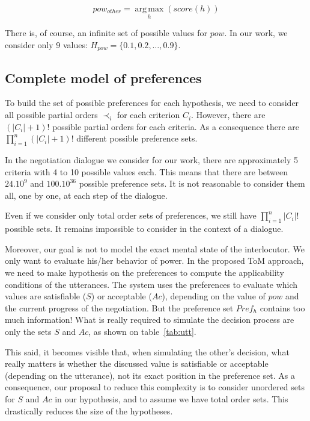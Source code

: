 \documentclass[sigconf]{aamas}  %
\begin{document}
	\begin{equation}
	pow_{other} = \operatorname*{arg\,max}_{h} (score(h))
	\end{equation}
	
	There is, of course, an infinite set of possible values for $pow$. In our work, we consider only 9 values: $H_{pow} = \{0.1, 0.2, \ldots, 0.9\}$.
	
	\subsection{Complete model of preferences}
	
	To build the set of possible preferences for each hypothesis, we need to consider all possible partial orders $\prec_i$ for each criterion $C_i$. However, there are $(|C_i| + 1)!$ possible partial orders for each criteria. As a consequence there are $\prod_{i=1}^n (|C_i|+1)!$ different possible preference sets.
	
	In the negotiation dialogue we consider for our work, there are approximately 5 criteria with 4 to 10 possible values each. This means that there are between $24.10^9$ and $100.10^{36}$ possible preference sets. It is not reasonable to consider them all, one by one, at each step of the dialogue.
	
	Even if we consider only total order sets of preferences, we still have  $\prod_{i=1}^n |C_i|!$ possible sets. It remains impossible to consider in the context of a dialogue.
	
	Moreover, our goal is not to model the exact mental state of the interlocutor. We only want to evaluate his/her behavior of power. In the proposed ToM approach, we need to make hypothesis on the preferences to compute the applicability conditions of the utterances. The system uses the preferences to evaluate which values are satisfiable ($S$) or acceptable ($Ac$), depending on the value of $pow$ and the current progress of the negotiation. But the preference set $Pref_h$ contains too much information! What is really required to simulate the decision process are only the sets $S$ and $Ac$, as shown on table~\ref{tab:utt}.
	
	This said, it becomes visible that, when simulating the other's decision, what really matters is whether the discussed value is satisfiable or acceptable (depending on the utterance), not its exact position in the preference set. As a consequence, our proposal to reduce this complexity is to consider unordered sets for $S$ and $Ac$ in our hypothesis, and to assume we have total order sets. This drastically reduces the size of the hypotheses.
	
\end{document}
